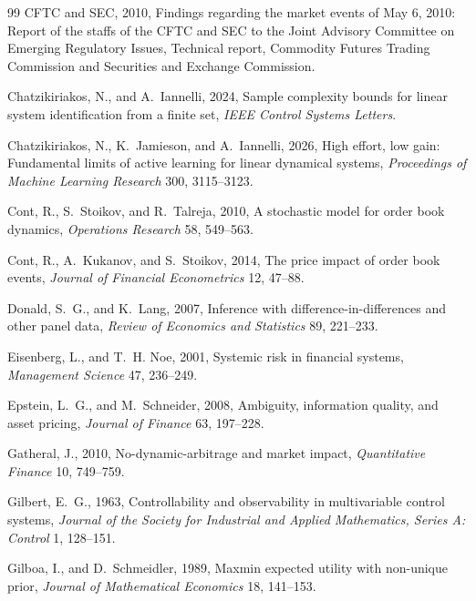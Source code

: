\documentclass[12pt]{article}
\theoremstyle{definition}
\theoremstyle{remark}
\begin{document}
\begin{thebibliography}{99}
CFTC and SEC, 2010, Findings regarding the market events of May 6, 2010: Report of the staffs of the CFTC and SEC to the Joint Advisory Committee on Emerging Regulatory Issues, Technical report, Commodity Futures Trading Commission and Securities and Exchange Commission.

Chatzikiriakos, N., and A.~Iannelli, 2024, Sample complexity bounds for linear system identification from a finite set, \emph{IEEE Control Systems Letters}.

Chatzikiriakos, N., K.~Jamieson, and A.~Iannelli, 2026, High effort, low gain: Fundamental limits of active learning for linear dynamical systems, \emph{Proceedings of Machine Learning Research} 300, 3115--3123.

Cont, R., S.~Stoikov, and R.~Talreja, 2010, A stochastic model for order book dynamics, \emph{Operations Research} 58, 549--563.

Cont, R., A.~Kukanov, and S.~Stoikov, 2014, The price impact of order book events, \emph{Journal of Financial Econometrics} 12, 47--88.

Donald, S.~G., and K.~Lang, 2007, Inference with difference-in-differences and other panel data, \emph{Review of Economics and Statistics} 89, 221--233.

Eisenberg, L., and T.~H. Noe, 2001, Systemic risk in financial systems, \emph{Management Science} 47, 236--249.

Epstein, L.~G., and M.~Schneider, 2008, Ambiguity, information quality, and asset pricing, \emph{Journal of Finance} 63, 197--228.

Gatheral, J., 2010, No-dynamic-arbitrage and market impact, \emph{Quantitative Finance} 10, 749--759.

Gilbert, E.~G., 1963, Controllability and observability in multivariable control systems, \emph{Journal of the Society for Industrial and Applied Mathematics, Series A: Control} 1, 128--151.

Gilboa, I., and D.~Schmeidler, 1989, Maxmin expected utility with non-unique prior, \emph{Journal of Mathematical Economics} 18, 141--153.


\end{thebibliography}
\end{document}
